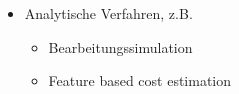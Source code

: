 {\begin{columns}[t]
\begin{column}[T]{6cm}
\begin{itemize}
\begin{itemize}
		\item z.B. Gewicht, Material oder kombiniert %
		\end{itemize}
		\item Analytische Verfahren, z.B.
		\begin{itemize}
		\item Bearbeitungssimulation
		\item Feature based cost estimation
		\end{itemize}
     	\end{itemize}
     \end{column}
 \end{columns}
}



